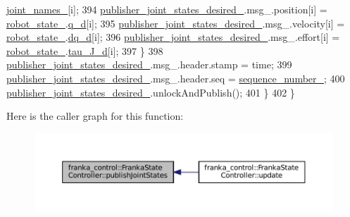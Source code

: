 \begin{DoxyCode}
      \hyperlink{classfranka__control_1_1FrankaStateController_afb6dc481c4d282d5f8f830f0cf943404}{joint\_names\_}[i];
394       \hyperlink{classfranka__control_1_1FrankaStateController_aff239ebea490b911ac660c5b79f6308d}{publisher\_joint\_states\_desired\_}.msg\_.position[i] = 
      \hyperlink{classfranka__control_1_1FrankaStateController_a0d097abb2665aadbc8d38662bba5ae8b}{robot\_state\_}.\hyperlink{structfranka_1_1RobotState_a706045af1b176049e9e56df755325bd2}{q\_d}[i];
395       \hyperlink{classfranka__control_1_1FrankaStateController_aff239ebea490b911ac660c5b79f6308d}{publisher\_joint\_states\_desired\_}.msg\_.velocity[i] = 
      \hyperlink{classfranka__control_1_1FrankaStateController_a0d097abb2665aadbc8d38662bba5ae8b}{robot\_state\_}.\hyperlink{structfranka_1_1RobotState_aed294a088be27b927be9575a18bec949}{dq\_d}[i];
396       \hyperlink{classfranka__control_1_1FrankaStateController_aff239ebea490b911ac660c5b79f6308d}{publisher\_joint\_states\_desired\_}.msg\_.effort[i] = 
      \hyperlink{classfranka__control_1_1FrankaStateController_a0d097abb2665aadbc8d38662bba5ae8b}{robot\_state\_}.\hyperlink{structfranka_1_1RobotState_a7086a89a2705810f93a3a95d43df2d9d}{tau\_J\_d}[i];
397     \}
398     \hyperlink{classfranka__control_1_1FrankaStateController_aff239ebea490b911ac660c5b79f6308d}{publisher\_joint\_states\_desired\_}.msg\_.header.stamp = time;
399     \hyperlink{classfranka__control_1_1FrankaStateController_aff239ebea490b911ac660c5b79f6308d}{publisher\_joint\_states\_desired\_}.msg\_.header.seq = 
      \hyperlink{classfranka__control_1_1FrankaStateController_ae36c62620e0099ce91976548bf51f240}{sequence\_number\_};
400     \hyperlink{classfranka__control_1_1FrankaStateController_aff239ebea490b911ac660c5b79f6308d}{publisher\_joint\_states\_desired\_}.unlockAndPublish();
401   \}
402 \}
\end{DoxyCode}
Here is the caller graph for this function\+:
\nopagebreak
\begin{figure}[H]
\begin{center}
\leavevmode
\includegraphics[width=350pt]{classfranka__control_1_1FrankaStateController_a37c67130a3359cb9cffa6af4a207615e_icgraph}
\end{center}
\end{figure}
\mbox{\label{classfranka__control_1_1FrankaStateController_abcab70ff196a1751f625bc14a789ca82}} 
